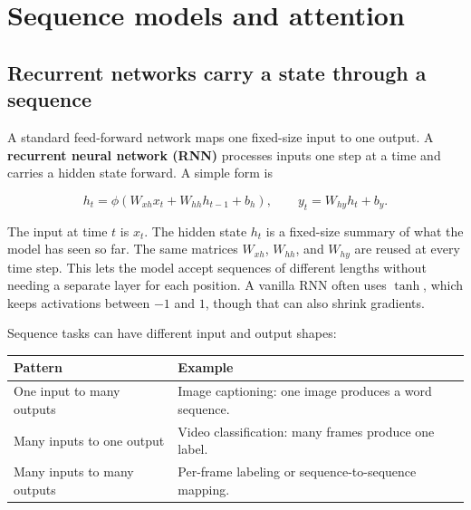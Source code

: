 \section{Sequence models and attention}\label{04-visual-computing-ii-ch031-sequence-models-and-attention}

\subsection{Recurrent networks carry a state through a sequence}\label{04-visual-computing-ii-ch031-recurrent-networks-carry-a-state-through-a-sequence}

A standard feed-forward network maps one fixed-size input to one output. A \textbf{recurrent neural network (RNN)} processes inputs one step at a time and carries a hidden state forward. A simple form is

\[h_t=\phi(W_{xh}x_t+W_{hh}h_{t-1}+b_h),\qquad y_t=W_{hy}h_t+b_y.\]

The input at time \(t\) is \(x_t\). The hidden state \(h_t\) is a fixed-size summary of what the model has seen so far. The same matrices \(W_{xh}\), \(W_{hh}\), and \(W_{hy}\) are reused at every time step. This lets the model accept sequences of different lengths without needing a separate layer for each position. A vanilla RNN often uses \(\tanh\), which keeps activations between \(-1\) and \(1\), though that can also shrink gradients.

Sequence tasks can have different input and output shapes:

{\def\LTcaptype{none} %
\begin{longtable}[]{@{}
  >{\raggedright\arraybackslash}p{}
  >{\raggedright\arraybackslash}p{}@{}}
\toprule\noalign{}
\begin{minipage}[b]{\linewidth}\raggedright
Pattern
\end{minipage} & \begin{minipage}[b]{\linewidth}\raggedright
Example
\end{minipage} \\
\midrule\noalign{}
\endhead
\bottomrule\noalign{}
\endlastfoot
One input to many outputs & Image captioning: one image produces a word sequence. \\
Many inputs to one output & Video classification: many frames produce one label. \\
Many inputs to many outputs & Per-frame labeling or sequence-to-sequence mapping. \\
\end{longtable}
}

